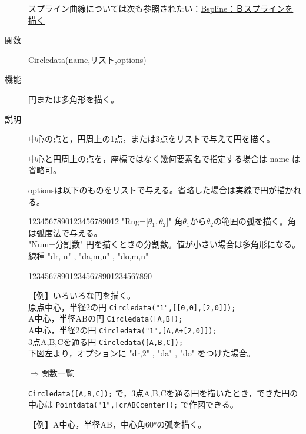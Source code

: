 \documentclass[papersize,a4paper,12pt,uplatex]{jsarticle}
\begin{document}
\begin{description}
   

\vspace{\baselineskip}
 スプライン曲線については次も参照されたい：\hyperlink{bspline}{Bspline：Ｂスプラインを描く} 


\vspace{\baselineskip}
\hypertarget{circledata}{}
\item[関数]  Circledata(name,リスト,options)  
\item[機能]  円または多角形を描く。
\item[説明]  中心の点と，円周上の1点，または3点をリストで与えて円を描く。

中心と円周上の点を，座標ではなく幾何要素名で指定する場合は name は省略可。

optionsは以下のものをリストで与える。省略した場合は実線で円が描かれる。
\begin{tabbing}
1234\=567890123456789012\=\kill
 \>    "Rng=[$\theta_1,\theta_2$]"  \>角$\theta_1$から$\theta_2$の範囲の弧を描く。角は弧度法で与える。\\
 \>    "Num=分割数"    \>円を描くときの分割数。値が小さい場合は多角形になる。\\
 \>    線種    \>"dr, n"  , "da,m,n" , "do,m,n"
\end{tabbing}
\begin{tabbing}
1234\=56789012345678901234567890\=\kill

【例】いろいろな円を描く。\\
 \>原点中心，半径2の円  \> \verb|Circledata("1",[[0,0],[2,0]]);|\\
 \>A中心，半径ABの円  \> \verb|Circledata([A,B]);|\\
 \>A中心，半径2の円  \> \verb|Circledata("1",[A,A+[2,0]]);|\\
 \>3点A,B,Cを通る円    \> \verb|Circledata([A,B,C]);|\\
 \>下図左より，オプションに "dr,2" , "da" , "do" をつけた場合。
\end{tabbing}
\hspace{10mm} 
\begin{flushright}  \hyperlink{functionlist}{$\Rightarrow$関数一覧}\end{flushright}

 \verb|Circledata([A,B,C]);| で，3点A,B,Cを通る円を描いたとき，できた円の中心は   \verb|Pointdata("1",[crABCcenter]);| で作図できる。
 
\vspace{\baselineskip}
【例】A中心，半径AB，中心角60°の弧を描く。


\end{description}
\end{document}
